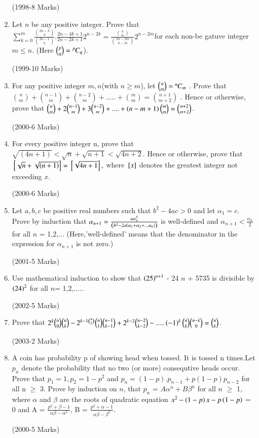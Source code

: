\documentclass[journal,12pt,twocolumn]{IEEEtran}
\theoremstyle{remark}
\begin{document}
\begin{enumerate}[start=16]
		\hfill(1998-8 Marks)
\item 
	Let $n$ be any positive integer. Prove that $\sum\limits^{m}_{k=0}\frac{\binom{2n-k}{k}}{\binom{2n-1}{n}}.\frac{2n-4k+1}{2n-2k+1}2^{n-2k}= \frac{\binom{n}{m}}{\binom{2n-2m}{n-m} } 2^{n-2m}$for each non-be gatuve integer $m\leq n$. (Here $\binom{p}{q} = {{}^{p}\mkern-1muC_{q}}$).

		\hfill(1999-10 Marks)
\item
	For any positive integer $m,n$(with $n \geq m$), let $\binom{n}{m} ={{}^{n}\mkern-1muC_{m}}$ . Prove that $\binom{n}{m} + \binom{n-1}{m} + \binom{n-2}{m} + ..... + \binom{m}{m} = \binom{n+1}{m+2}$ . Hence or otherwise, prove that $\binom{n}{m} +2\binom{n-1}{m} +3\binom{n-2}{m}+....+ \left(n-m+1\right) \binom{m}{m} = \binom{n+2}{m+2}$.

		\hfill(2000-6 Marks)
\item
	For every positive integer n, prove that $\sqrt{(4n+1)} < \sqrt{n} +\sqrt{n+1} < \sqrt{4n+2}$. Hence or otherwise, prove that ${}\left[\sqrt{n} + \sqrt{\left(n+1\right)}\right]= {}\left[\sqrt{4n+1}\right],$ where ${}\left[x\right]$ denotes the greatest integer not exceeding $x$.

		\hfill(2000-6 Marks)
\item
Let $a,b,c$ be positive real numbers such that $b^2 - 4ac > 0$ and let $\alpha_1 = c$. Prove by induction that $\alpha_{n+1} = \frac{a \alpha_{n}^2}{\left(b^2 - 2a \left(\alpha_1 + \alpha_2 + ... \alpha_n\right)\right)}$ is well-defined and $\alpha_{n+1} < \frac{\alpha_n}{2}$ for all $n$ = 1,2,...
		(Here,'well-defined' means that the denominator in the expression for $\alpha_{n+1}$ is not zero.)

		\hfill(2001-5 Marks)
\item
Use mathematical induction to show that $\left(25\right)^{n+1}$ - 24 $n$ + 5735 is divisible by $\left(24\right)^2$ for all $n$= 1,2,.....

		\hfill(2002-5 Marks)
\item 
Prove that $2^k \binom{n}{0}\binom{n}{k} - 2^{k-1\binom{n}{2}} \binom{n}{1} \binom{n-1}{k-1} + 2^{k-2}\binom{n-2}{k-2} - .....\left(-1\right)^k \binom{n}{k}\binom{n-k}{0} = \binom{n}{k}$.

		\hfill(2003-2 Marks)
\item
A coin has probability p of showing head when tossed. It is tossed n times.Let $p_n$ denote the probability that no two (or more) consequtive heads occur. Prove that $p_1=1 , p_2=1-p^2$ and $p_n = (1-p).p_{n-1} + p(1-p)p_{n-2}$ for all n $\geq$ 3. Prove by induction on $n$, that $p_n$ = $A\alpha^n + B\beta^n$ for all $n$ $\geq$ 1, where $\alpha$ and $\beta$ are the roots of quadratic equation $x^2 - \left(1-p\right)x - p\left(1-p\right)$ = 0 and A = $\frac{p^2 + \beta -1}{\alpha\beta-\alpha^2}$, B = $\frac{p^2 + \alpha -1}{\alpha\beta - \beta^2}$.

		\hfill(2000-5 Marks)



\end{enumerate}
\end{document}
